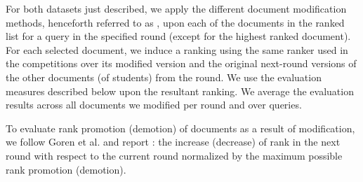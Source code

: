 For both datasets just described, we apply the different document
modification methods, henceforth referred to as ,
upon each of the documents in the ranked list for a query in the
specified round (except for the highest ranked document). For each
selected document, we induce a ranking using the same ranker used in
the competitions over its modified version and the original next-round
versions of the other documents (of students) from the round. We use
the evaluation measures described below upon the resultant ranking. We
average the evaluation results across all documents we modified per
round and over queries.

To evaluate rank promotion (demotion) of documents as a result of
modification, we follow Goren et al. \cite{goren2020ranking} and
report : the increase (decrease) of rank in the next round with respect to the current round normalized by the maximum possible rank promotion (demotion).





